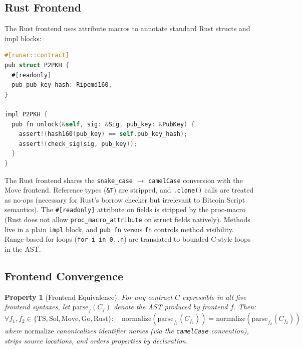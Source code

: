 \documentclass[11pt,a4paper]{article}
\newtheorem{property}[theorem]{Property}
\begin{document}
\subsection{Rust Frontend}
\label{sec:frontend-rs}

The Rust frontend uses attribute macros to annotate standard Rust structs and
impl blocks:

\begin{lstlisting}[style=runar,language=C,
  morekeywords={pub,struct,impl,fn,let,mut,self,use}]
#[runar::contract]
pub struct P2PKH {
  #[readonly]
  pub pub_key_hash: Ripemd160,
}

impl P2PKH {
  pub fn unlock(&self, sig: &Sig, pub_key: &PubKey) {
    assert!(hash160(pub_key) == self.pub_key_hash);
    assert!(check_sig(sig, pub_key));
  }
}
\end{lstlisting}

The Rust frontend shares the \texttt{snake\_case} $\to$ \texttt{camelCase}
conversion with the Move frontend. Reference types (\texttt{\&T}) are
stripped, and \texttt{.clone()} calls are treated as no-ops (necessary for
Rust's borrow checker but irrelevant to Bitcoin Script semantics).
The \texttt{\#[readonly]} attribute on fields is stripped by the proc-macro
(Rust does not allow \texttt{proc\_macro\_attribute} on struct fields
natively). Methods live in a plain \texttt{impl} block, and \texttt{pub fn}
versus \texttt{fn} controls method visibility.
Range-based for loops (\texttt{for i in 0..n}) are translated to
bounded C-style loops in the AST.

\subsection{Frontend Convergence}
\label{sec:convergence}

\begin{property}[Frontend Equivalence]
\label{prop:frontend-equiv}
For any contract $C$ expressible in all five frontend syntaxes, let
$\text{parse}_f(C_f)$ denote the AST produced by frontend $f$. Then:
\[
  \forall f_1, f_2 \in \{\text{TS}, \text{Sol}, \text{Move}, \text{Go}, \text{Rust}\}:
  \quad \text{normalize}(\text{parse}_{f_1}(C_{f_1})) = \text{normalize}(\text{parse}_{f_2}(C_{f_2}))
\]
where $\text{normalize}$ canonicalizes identifier names (via the
\texttt{camelCase} convention), strips source locations, and orders
properties by declaration.
\end{property}
\end{document}
